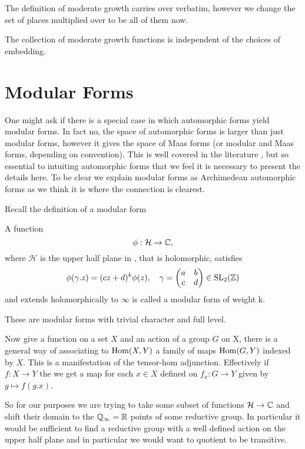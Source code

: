 	The definition of moderate growth carries over verbatim, however we change the set of places multiplied over to be all of them now.
    
    \begin{remark}
        The collection of moderate growth functions is independent of the choices of embedding. 
    \end{remark}

\section{Modular Forms}
One might ask if there is a special case in which automorphic forms yield modular forms. In fact no, the space of automorphic forms is larger than just modular forms, however it gives the space of Maas forms (or modular and Maas forms, depending on convention). This is well covered in the literature \cite{emertonCLASSICALMODULARFORMS}\cite[3.2]{bumpAutomorphicFormsRepresentations1997}\cite{booherVIEWINGMODULARFORMS}\cite{garrettTransitionEisensteinSeries2016}, but so essential to intuiting automorphic forms that we feel it is necessary to present the details here. To be clear we explain modular forms as Archimedean automorphic forms as we think it is where the connection is clearest. 

	Recall the definition of a modular form 
	\begin{Definition}
		A function
		\[\phi: \mathcal{H} \to \C,\]
		where \(\mathcal{H}\) is the upper half plane in \C, that is holomorphic, satisfies 
		\[\phi(\gamma.z) = (cz+d)^k\phi(z), \quad \gamma = \begin{pmatrix}
			a &b \\
			c &d
		\end{pmatrix}\in \SL_2(\Z)\]
		and extends holomorphically to \(\infty\) is called a modular form of weight k.
	\end{Definition}
	These are modular forms with trivial character and full level.


	Now give a function on a set \(X\) and an action of a group \(G\) on X, there is a general way of associating to \(\operatorname{Hom}(X, Y)\) a family of maps \(\operatorname{Hom}(G, Y)\) indexed by \(X\). This is a manifestation of the tensor-hom adjunction. Effectively if \(f: X\to Y\) the we get a map for each \(x\in X\) defined on \(f_x : G \to Y\) given by \(g\mapsto f(g.x)\).

	So for our purposes we are trying to take some subset of functions \(\mathcal{H} \to \C\) and shift their domain to the \(\Q_\infty = \R\) points of some reductive group. In particular it would be sufficient to find a reductive group with a well defined action on the upper half plane and in particular we would want to quotient to be transitive.

